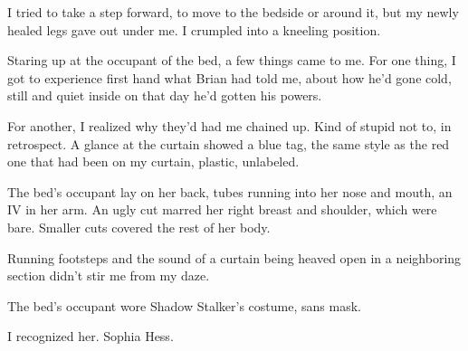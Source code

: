 I tried to take a step forward, to move to the bedside or around it, but my newly healed legs gave out under me.  I crumpled into a kneeling position.



Staring up at the occupant of the bed, a few things came to me.  For one thing, I got to experience first hand what Brian had told me, about how he'd gone cold, still and quiet inside on that day he'd gotten his powers.



For another, I realized why they'd had me chained up.  Kind of stupid not to, in retrospect.  A glance at the curtain showed a blue tag, the same style as the red one that had been on my curtain, plastic, unlabeled.



The bed's occupant lay on her back, tubes running into her nose and mouth, an IV in her arm.  An ugly cut marred her right breast and shoulder, which were bare.  Smaller cuts covered the rest of her body.



Running footsteps and the sound of a curtain being heaved open in a neighboring section didn't stir me from my daze.



The bed's occupant wore Shadow Stalker's costume, sans mask.



I recognized her.  Sophia Hess.





